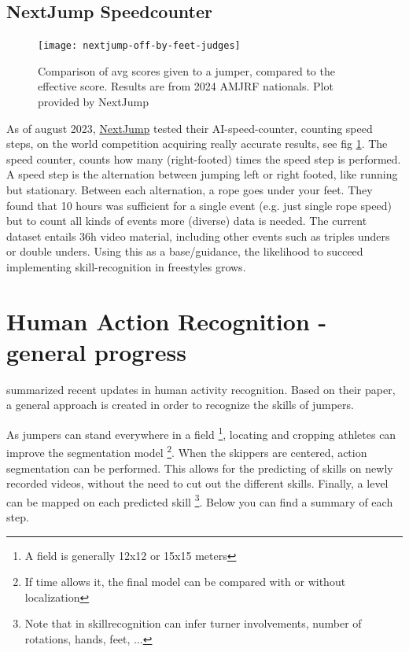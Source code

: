 \subsection{NextJump Speedcounter}
\label{lit:nextjump-speedcounter}


\begin{figure}
    \centering
    \texttt{[image: nextjump-off-by-feet-judges]}
    \caption[nextjump-results-multi]{Comparison of avg scores given to a jumper, compared to the effective score. Results are from 2024 AMJRF nationals. Plot provided by NextJump}
    \label{fig:nextjump-results-off-by-feet-judges-amjrf-2024}
\end{figure}

As of august 2023, \href{https://nextjump.app/}{NextJump} tested their AI-speed-counter, counting speed steps, on the world competition acquiring really accurate results, see fig \ref{fig:nextjump-results-off-by-feet-judges-amjrf-2024}.
The speed counter, counts how many (right-footed) times the speed step is performed. A speed step is the alternation between jumping left or right footed, like running but stationary. Between each alternation, a rope goes under your feet.
They found that 10 hours was sufficient for a single event (e.g. just single rope speed) but to count all kinds of events more (diverse) data is needed. The current dataset entails 36h video material, including other events such as triples unders or double unders. Using this as a base/guidance, the likelihood to succeed implementing skill-recognition in freestyles grows.


\section{Human Action Recognition - general progress}
\label{lit:human-action-recognition}

\textcite{Pareek_2020} summarized recent updates in human activity recognition. Based on their paper, a general approach is created in order to recognize the skills of jumpers.

As jumpers can stand everywhere in a field \footnote{A field is generally 12x12 or 15x15 meters}, locating and cropping athletes can improve the segmentation model \footnote{If time allows it, the final model can be compared with or without localization}. When the skippers are centered, action segmentation can be performed. This allows for the predicting of skills on newly recorded videos, without the need to cut out the different skills. Finally, a level can be mapped on each predicted skill \footnote{Note that in skillrecognition can infer turner involvements, number of rotations, hands, feet, ...}. Below you can find a summary of each step.

